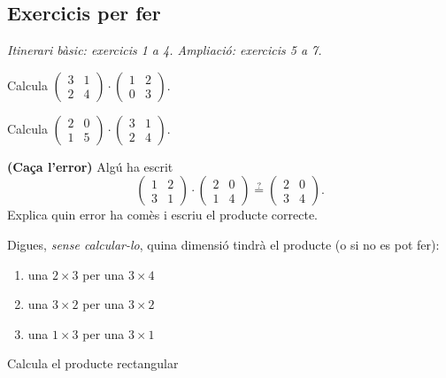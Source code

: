 \subsection{Exercicis per fer}

\textit{Itinerari bàsic: exercicis 1 a 4. Ampliació: exercicis 5 a 7.}

\begin{exercicis}
\begin{exlist}
  \item Calcula $\begin{pmatrix} 3 & 1 \\ 2 & 4 \end{pmatrix}\cdot\begin{pmatrix} 1 & 2 \\ 0 & 3 \end{pmatrix}$.
  \item Calcula $\begin{pmatrix} 2 & 0 \\ 1 & 5 \end{pmatrix}\cdot\begin{pmatrix} 3 & 1 \\ 2 & 4 \end{pmatrix}$.
  \item \textbf{(Caça l'error)} Algú ha escrit
        \[ \begin{pmatrix} 1 & 2 \\ 3 & 1 \end{pmatrix}\cdot\begin{pmatrix} 2 & 0 \\ 1 & 4 \end{pmatrix}
           \overset{?}{=}\begin{pmatrix} 2 & 0 \\ 3 & 4 \end{pmatrix}. \]
        Explica quin error ha comès i escriu el producte correcte.
  \item Digues, \emph{sense calcular-lo}, quina dimensió tindrà el producte (o si
        no es pot fer):
        \begin{enumerate}[label=\alph*), leftmargin=1.6em, topsep=2pt]
          \item una $2\times 3$ per una $3\times 4$
          \item una $3\times 2$ per una $3\times 2$
          \item una $1\times 3$ per una $3\times 1$
        \end{enumerate}
  \item Calcula el producte rectangular

\end{exlist}
\end{exercicis}
